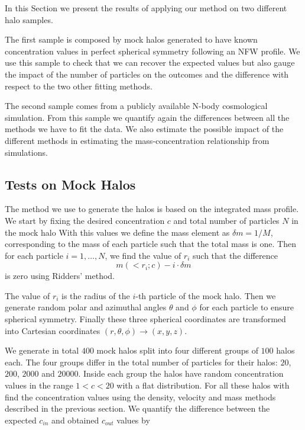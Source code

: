 \documentclass[useAMS,usenatbib]{mn2e}
\begin{document}
In this Section we present the results of applying our method on two
different halo samples.

The first sample is composed by mock halos generated to have known
concentration values in perfect spherical symmetry following an NFW
profile.
We use this sample to check that we can recover the expected values
but also gauge the impact of the number of particles on the outcomes
and the difference with respect to the two other fitting methods.


The second sample comes from a publicly available N-body cosmological
simulation.
From this sample we quantify again the differences between all the
methods we have to fit the data.
We also estimate the possible impact of the different methods in
estimating the mass-concentration relationship from simulations.

\subsection{Tests on Mock Halos}

The method we use to generate the halos is based on the integrated
mass profile.
We start by fixing the desired concentration $c$ and total number of
particles $N$ in the mock halo
With this values we define the mass element as $\delta m = 1/M$, corresponding
to the mass of each particle such that the total mass is one.
Then for each particle $i=1,\ldots,N$, we find the value of $r_i$ such that
the difference
%
\begin{equation}
m(<r_i;c) - i \cdot \delta m
\end{equation}
%
is zero using Ridders' method.

The value of $r_i$ is the radius of the $i$-th particle of the mock
halo.
Then we generate random polar and azimuthal angles $\theta$ and $\phi$
for each particle to ensure spherical symmetry.
Finally these three spherical coordinates are transformed into Cartesian coordinates
$(r,\theta,\phi) \rightarrow (x,y,z)$.



We generate in total $400$ mock halos split into four different
groups of $100$ halos each.
The four groups differ in the total number of particles for their halos:
$20$, $200$, $2000$ and $20000$.
Inside each group the halos have random concentration values in
the range $1<c<20$ with a flat distribution.
For all these halos with find the concentration values using the
density, velocity and mass methods described in the previous
section. We quantify the difference between the expected $c_{in}$
and obtained $c_{out}$ values by
\end{document}
